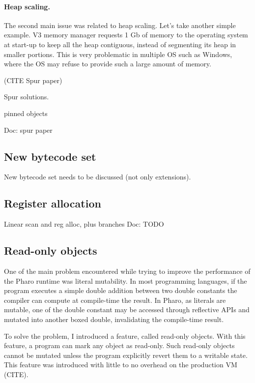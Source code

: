 \documentclass[a4paper,12pt,twoside]{../includes/ThesisStyle}
\begin{document}
\paragraph{Heap scaling.} The second main issue was related to heap scaling. Let's take another simple example. V3 memory manager requests 1 Gb of memory to the operating system at start-up to keep all the heap contiguous, instead of segmenting its heap in smaller portions. This is very problematic in multiple OS such as Windows, where the OS may refuse to provide such a large amount of memory. 

(CITE Spur paper)
\cite{Mir15a}

Spur solutions.

pinned objects

Doc: spur paper

\subsection{New bytecode set}
New bytecode set needs to be discussed (not only extensions).

\subsection{Register allocation}

Linear scan and reg alloc, plus branches
Doc: TODO

\subsection{Read-only objects}


\cite{Bera16b}

One of the main problem encountered while trying to improve the performance of the Pharo runtime was literal mutability. In most programming languages, if the program executes a simple double addition between two double constants the compiler can compute at compile-time the result. In Pharo, as literals are mutable, one of the double constant may be accessed through reflective APIs and mutated into another boxed double, invalidating the compile-time result. 

To solve the problem, I introduced a feature, called read-only objects. With this feature, a program can mark any object as read-only. Such read-only objects cannot be mutated unless the program explicitly revert them to a writable state. This feature was introduced with little to no overhead on the production VM (CITE). 
\end{document}
